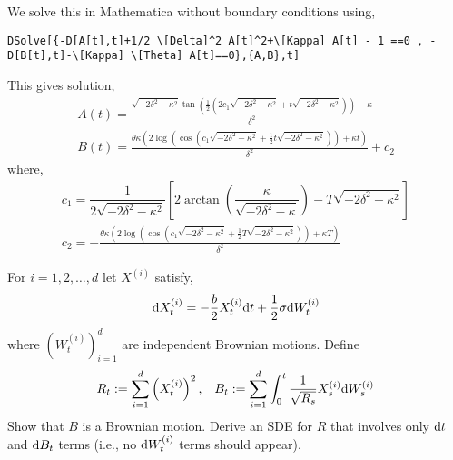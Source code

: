 \documentclass[10pt]{article}
\begin{document}
\begin{solution}[Solution]
We solve this in Mathematica without boundary conditions using,
\begin{lstlisting}
DSolve[{-D[A[t],t]+1/2 \[Delta]^2 A[t]^2+\[Kappa] A[t] - 1 ==0 , -D[B[t],t]-\[Kappa] \[Theta] A[t]==0},{A,B},t]
\end{lstlisting}

This gives solution,
\begin{align*}
    A(t) = \frac{\sqrt{-2 \delta ^2-\kappa ^2} \tan \left(\frac{1}{2} \left(2 c_1 \sqrt{-2 \delta ^2-\kappa ^2}+t \sqrt{-2 \delta ^2-\kappa ^2}\right)\right)-\kappa }{\delta ^2} \\
    B(t) = \frac{\theta  \kappa  \left(2 \log \left(\cos \left(c_1 \sqrt{-2 \delta ^2-\kappa ^2}+\frac{1}{2} t \sqrt{-2 \delta ^2-\kappa ^2}\right)\right)+\kappa  t\right)}{\delta ^2}+c_2
\end{align*}
where,
\begin{align*}
    c_1 = \dfrac{1}{2\sqrt{-2\delta^2-\kappa^2}} \left[ 2\arctan\left(\dfrac{\kappa}{\sqrt{-2\delta^2-\kappa}} \right) - T\sqrt{-2\delta^2-\kappa^2} \right] \\
    c_2 =  -\frac{\theta  \kappa  \left(2 \log \left(\cos \left(c_1 \sqrt{-2 \delta ^2-\kappa ^2}+\frac{1}{2} T \sqrt{-2 \delta ^2-\kappa ^2}\right)\right)+\kappa  T\right)}{\delta ^2}
\end{align*}
\end{solution}


\begin{problem}[Exercise 9.3]
For \( i=1,2, \ldots, d \) let \( X^{(i)} \) satisfy,
    \begin{align*}
        \mathrm{d} X_t^{(i)} = -\dfrac{b}{2} X_t^{(i)} \mathrm{d} t + \dfrac{1}{2}\sigma\mathrm{d} W_t^{(i)}
    \end{align*}
    where \( (W_t^{(i)})_{i=1}^{d} \) are independent Brownian motions. Define
    \begin{align*}
        R_t := \sum_{i=1}^{d} \left(X_t^{(i)}\right)^2, && B_t := \sum_{i=1}^{d} \int_{0}^{t} \dfrac{1}{\sqrt{R_s}}X_s^{(i)} \mathrm{d} W_s^{(i)}
    \end{align*}
    Show that \( B \) is a Brownian motion. Derive an SDE for \( R \) that involves only \( \mathrm{d} t \) and \( \mathrm{d} B_t \) terms (i.e., no \( \mathrm{d} W_t^{(i)} \) terms should appear).
\end{problem}
\end{document}
